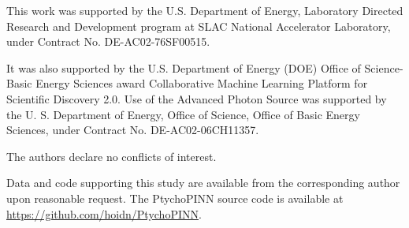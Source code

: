 \documentclass{optica-article}
\begin{document}
\begin{backmatter}
This work was supported by the U.S. Department of Energy, Laboratory Directed Research and Development program at SLAC National Accelerator Laboratory, under Contract No. DE-AC02-76SF00515.

It was also supported by the U.S. Department of Energy (DOE) Office of Science-Basic Energy Sciences award Collaborative Machine Learning Platform for Scientific Discovery 2.0. Use of the Advanced Photon Source was supported by the U. S. Department of Energy, Office of Science, Office of Basic Energy Sciences, under Contract No. DE-AC02-06CH11357.

The authors declare no conflicts of interest.

Data and code supporting this study are available from the corresponding author upon reasonable request. The PtychoPINN source code is available at \url{https://github.com/hoidn/PtychoPINN}.
\end{backmatter}


\end{document}
